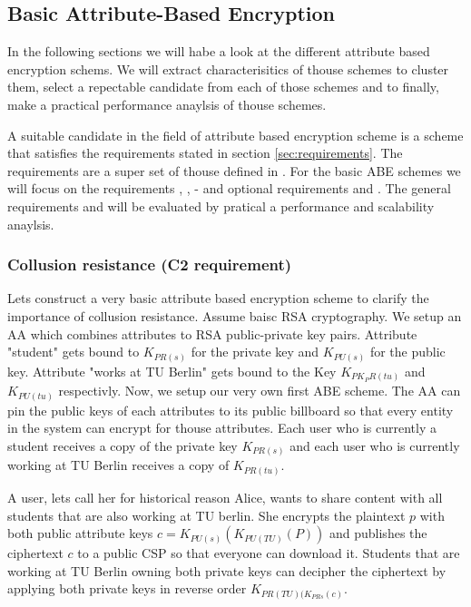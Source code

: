 \subsection{Basic Attribute-Based Encryption}
In the following sections we will habe a look at the different attribute based encryption schems. We will extract characterisitics of thouse schemes to cluster them, select a repectable candidate from each of those schemes and to finally, make a practical performance anaylsis of thouse schemes. 

A suitable candidate in the field of attribute based encryption scheme is a scheme that satisfies the requirements stated in section \ref{sec:requirements}. The requirements are a super set of thouse defined in \cite{lee2013survey}. For the basic ABE schemes we will focus on the requirements , ,  -  and optional requirements  and .
The general requirements  and  will be evaluated by pratical a performance and scalability anaylsis.

\subsubsection{Collusion resistance (C2 requirement)}
Lets construct a very basic attribute based encryption scheme to clarify the importance of collusion resistance. Assume baisc RSA cryptography. We setup an AA which combines attributes to RSA public-private key pairs. Attribute "student" gets bound to $K_{PR(s)}$ for the private key and $K_{PU(s)}$ for the public key. Attribute "works at TU Berlin" gets bound to the Key $K_{PK_PR(tu)}$ and $K_{PU(tu)}$ respectivly. Now, we setup our very own first ABE scheme. The AA can pin the public keys of each attributes to its public billboard so that every entity in the system can encrypt for thouse attributes. Each user who is currently a student receives a copy of the private key $K_{PR(s)}$ and each user who is currently working at TU Berlin receives a copy of $K_{PR(tu)}$. 

A user, lets call her for historical reason Alice, wants to share content with all students that are also working at TU berlin. She encrypts the plaintext $p$ with both public attribute keys $c = K_{PU(s)}(K_{PU(TU)}(P))$ and publishes the ciphertext $c$ to a public CSP so that everyone can download it. Students that are working at TU Berlin owning both private keys can decipher the ciphertext by applying both private keys in reverse order $K_{PR(TU)(K_{PR{s}}(c)}$.

